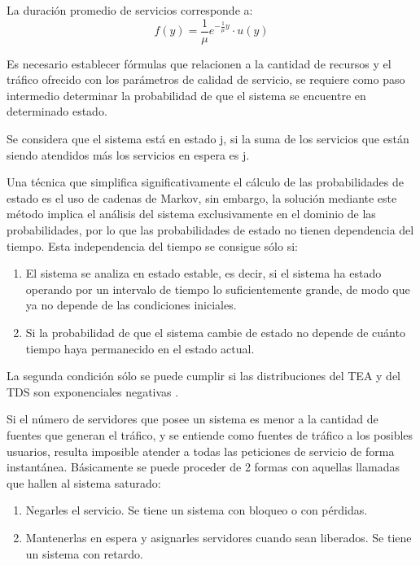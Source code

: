 La duración promedio de servicios corresponde a:
\begin{equation}
f(y)=\frac{1}{\mu } e^{-\frac{1}{\mu} y} \cdot u(y)
\label{eqn:mu}
\end{equation} 

Es necesario establecer fórmulas que relacionen a la cantidad de recursos y el tráfico ofrecido con los parámetros de calidad de servicio, se requiere como paso intermedio determinar la probabilidad de que el sistema se encuentre en determinado estado.\newline

Se considera que el sistema está en estado j, si la suma de los servicios que están siendo atendidos más los servicios en espera es j.\newline

Una técnica que simplifica significativamente el cálculo de las probabilidades de estado es el uso de cadenas de Markov, sin embargo, la solución mediante este método implica el análisis del sistema exclusivamente en el dominio de las probabilidades, por lo que las probabilidades de estado no tienen dependencia del tiempo. Esta independencia del tiempo se consigue sólo si:

\begin{enumerate}
\item  El sistema se analiza en estado estable, es decir, si el sistema ha estado operando por un intervalo de tiempo lo suficientemente grande, de modo que ya no depende de las condiciones iniciales.
\item  Si la probabilidad de que el sistema cambie de estado no depende de cuánto tiempo haya permanecido en el estado actual.
\end{enumerate}

 La segunda condición sólo se puede cumplir si las distribuciones del TEA y del TDS son exponenciales negativas \parencite{Carter1990}.\newline

 Si el número de servidores que posee un sistema es menor a la cantidad de fuentes que generan el tráfico, y se entiende como fuentes de tráfico a los posibles usuarios, resulta imposible atender a todas las peticiones de servicio de forma instantánea. Básicamente se puede proceder de 2 formas con aquellas llamadas que hallen al sistema saturado:
\begin{enumerate}
\item  Negarles el servicio. Se tiene un sistema con bloqueo o con pérdidas.
\item  Mantenerlas en espera y asignarles servidores cuando sean liberados. Se tiene un sistema con retardo.
\end{enumerate}


